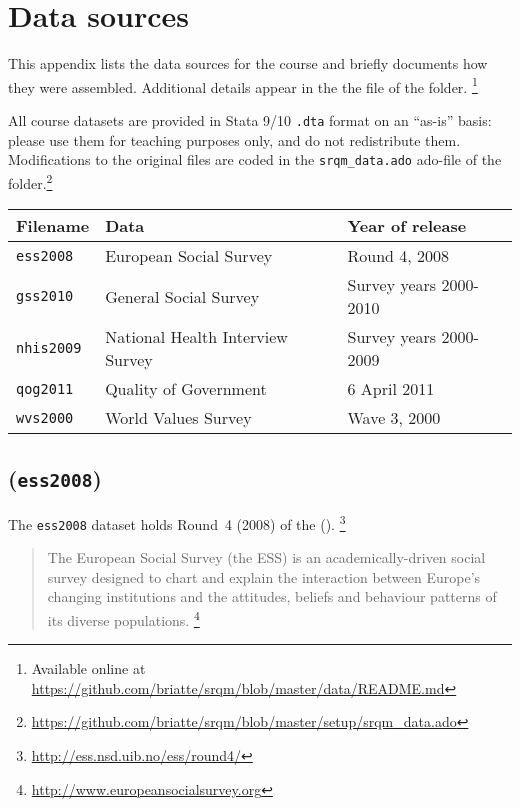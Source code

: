 %
%
\chapter[Sources]{Data sources}%
	\label{ch:data-sources}

This appendix lists the data sources for the course and briefly documents how they were assembled. Additional details appear in the the \README file of the \data folder.%
  \footnote{Available online at \url{https://github.com/briatte/srqm/blob/master/data/README.md}}

All course datasets are provided in Stata 9/10 \texttt{.dta} format on an ``as-is'' basis: please use them for teaching purposes only, and do not redistribute them. Modifications to the original files are coded in the \texttt{srqm\_data.ado} ado-file of the \setup folder.\footnote{\url{https://github.com/briatte/srqm/blob/master/setup/srqm\_data.ado}}

\bigskip
\begin{table}
\begin{center}
\footnotesize
\begin{tabular}{lll}
\toprule
Filename & Data & Year of release \\
\midrule
\quad \texttt{ess2008} & European Social Survey & Round 4, 2008 \\
\quad \texttt{gss2010} & General Social Survey & Survey years 2000-2010  \\
\quad \texttt{nhis2009} & National Health Interview Survey & Survey years 2000-2009 \\
\quad \texttt{qog2011} & Quality of Government & 6 April 2011 \\
\quad \texttt{wvs2000} & World Values Survey & Wave 3, 2000 \\
\bottomrule
\end{tabular}
\end{center}
\label{tab:data-source}
\end{table}

\section*{\ess (\texttt{ess2008})}

The \texttt{ess2008} dataset holds Round~4 (2008) of the \ess (\ESS).%
	\footnote{\url{http://ess.nsd.uib.no/ess/round4/}}

\begin{quote}
	The European Social Survey (the ESS) is an academically-driven social survey designed to chart and explain the interaction between Europe's changing institutions and the attitudes, beliefs and behaviour patterns of its diverse populations.%
	\footnote{\url{http://www.europeansocialsurvey.org}}
\end{quote}

